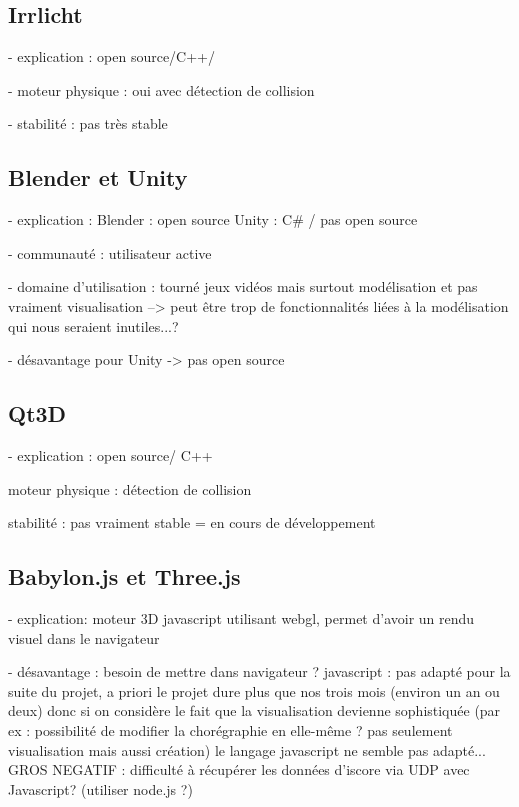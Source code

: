 \subsection{Irrlicht}
- explication : open source/C++/

- moteur physique : oui avec détection de collision

- stabilité : pas très stable 

\subsection{Blender et Unity}
- explication : Blender : open source
				Unity : C\# / pas open source
				
- communauté  : utilisateur active

- domaine d'utilisation : tourné jeux vidéos mais surtout modélisation et pas vraiment visualisation
--> peut être trop de fonctionnalités liées à la modélisation qui nous seraient inutiles...?

- désavantage pour Unity -> pas open source

\subsection{Qt3D}
- explication : open source/ C++

moteur physique : détection de collision

stabilité : pas vraiment stable = en cours de développement

\subsection{Babylon.js et Three.js}
- explication: moteur 3D javascript utilisant webgl, permet d'avoir un rendu visuel dans le navigateur

- désavantage : 
		besoin de mettre dans navigateur  ? 
	javascript : pas adapté pour la suite du projet, a priori le projet dure plus que nos trois mois (environ un an ou deux) donc si on considère le fait que la visualisation devienne sophistiquée (par ex : possibilité de modifier la chorégraphie en elle-même ? pas seulement visualisation mais aussi création) le langage javascript ne semble pas adapté...
		GROS NEGATIF : difficulté à récupérer les données d'iscore via UDP avec Javascript? (utiliser node.js ?)